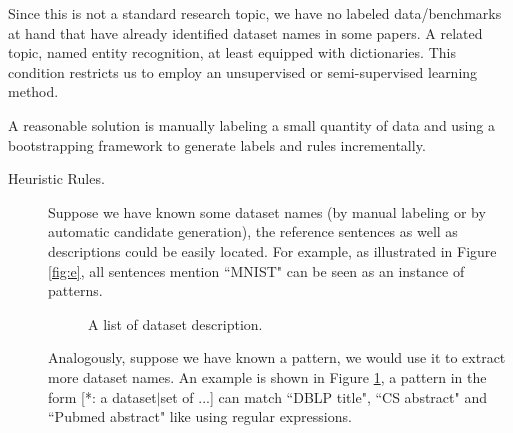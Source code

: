 \documentclass[fleqn]{article}
\begin{document}
Since this is not a standard research topic, we have no labeled data/benchmarks at hand that have already identified dataset names in some papers. A related topic, named entity recognition, at least equipped with dictionaries. This condition restricts us to employ an unsupervised or semi-supervised learning method.

A reasonable solution is manually labeling a small quantity of data and using a bootstrapping framework to generate labels and rules incrementally.

\begin{description}
\item[Heuristic Rules.] Suppose we have known some dataset names (by manual labeling or by automatic candidate generation), the reference sentences as well as descriptions could be easily located. For example, as illustrated in Figure \ref{fig:e}, all sentences mention ``MNIST" can be seen as an instance of patterns.

\begin{figure}[hb]
\centering
{}
\caption{A list of dataset description.}
\label{fig:list}
\end{figure}

Analogously, suppose we have known a pattern, we would use it to extract more dataset names. An example is shown in Figure \ref{fig:list}, a pattern in the form [*: a dataset$|$set of ...] can match ``DBLP title", ``CS abstract" and ``Pubmed abstract" like using regular expressions.


\end{description}
\end{document}
